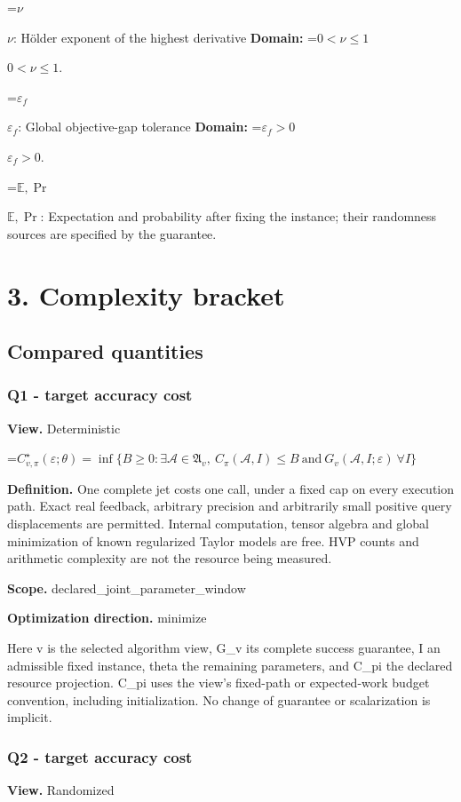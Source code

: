\documentclass[10pt,a4paper]{article}
\newcommand{\AtlasMath}[1]{\par\begingroup\centering\setbox0=\hbox{$\displaystyle #1$}\ifdim\wd0>1.4\linewidth\typeout{ATLAS WIDE FORMULA: \the\wd0}\fi\ifdim\wd0>\linewidth\resizebox{\linewidth}{!}{\box0}\else\box0\fi\par\endgroup}
\newcommand{\AtlasInlineMath}[1]{\begingroup\setbox0=\hbox{$#1$}\ifdim\wd0>.4\linewidth\endgroup\AtlasMath{#1}\else\endgroup$#1$\fi}
\begin{document}
\AtlasInlineMath{\nu}: Hölder exponent of the highest derivative \textbf{Domain:} \AtlasInlineMath{0<\nu\le1}.

\AtlasInlineMath{\varepsilon_f}: Global objective-gap tolerance \textbf{Domain:} \AtlasInlineMath{\varepsilon_f>0}.

\AtlasInlineMath{\mathbb{E},\Pr}: Expectation and probability after fixing the instance; their randomness sources are specified by the guarantee.

\section{3. Complexity bracket}
\subsection{Compared quantities}
\subsubsection{Q1 - target accuracy cost}
\textbf{View.} Deterministic

\AtlasMath{C^\star_{v,\pi}(\varepsilon;\theta)=\inf\{B\ge0:\exists\mathcal A\in\mathfrak A_v,\ C_\pi(\mathcal A,I)\le B\ \text{and}\ G_v(\mathcal A,I;\varepsilon)\ \forall I\}}
\textbf{Definition.} One complete jet costs one call, under a fixed cap on every execution path. Exact real feedback, arbitrary precision and arbitrarily small positive query displacements are permitted. Internal computation, tensor algebra and global minimization of known regularized Taylor models are free. HVP counts and arithmetic complexity are not the resource being measured.

\textbf{Scope.} declared\_joint\_parameter\_window

\textbf{Optimization direction.} minimize

Here v is the selected algorithm view, G\_v its complete success guarantee, I an admissible fixed instance, theta the remaining parameters, and C\_pi the declared resource projection. C\_pi uses the view's fixed-path or expected-work budget convention, including initialization. No change of guarantee or scalarization is implicit.

\subsubsection{Q2 - target accuracy cost}
\textbf{View.} Randomized
\end{document}
